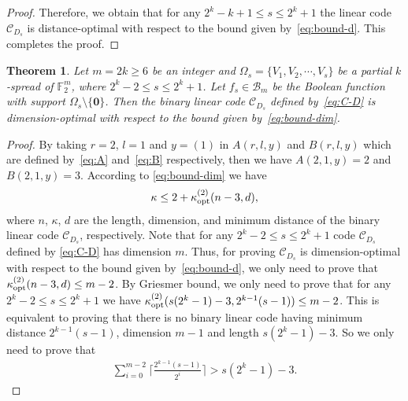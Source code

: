 \documentclass[10pt]{article}
\newtheorem{theorem}{Theorem}
\newcommand{\F}{\mathbb{F}}
\newcommand{\0}{\textbf{0}}
\newcommand{\1}{\textbf{1}}
\newcommand{\C}{{\mathcal C}}
\begin{document}
{\begin{proof}
Therefore, we obtain that for any $2^k-k+1\leq s\leq 2^k+1$ the linear code $\C_{D_s}$  is distance-optimal with respect to the bound given by~\eqref{eq:bound-d}.
This completes the proof.
\end{proof}



\begin{theorem}\label{T:BoundPS}
Let $m=2k\geq 6$ be an integer and $\Omega_s=\{V_1,V_2,\cdots,V_s\}$ be a partial $k$-spread of $\F_2^m$,
where $2^k-2\leq s\leq 2^k+1$.
Let $f_s\in\mathcal{B}_{m}$ be the Boolean function with support $\Omega_s\setminus\{\0\}$.
Then the binary linear code $\C_{D_s}$ defined by~\eqref{eq:C-D} is dimension-optimal with respect to the bound given by~\eqref{eq:bound-dim}.
\end{theorem}
\begin{proof}
By taking $r=2$, $l=1$ and $y=(1)$ in $A(r, l, y)$ and $B(r, l, y)$ which are defined by~\eqref{eq:A} and~\eqref{eq:B} respectively,
then we have  $A(2, 1, y)=2$ and  $B(2, 1, y)=3$.
According to \eqref{eq:bound-dim} we have
\begin{eqnarray*}
 \kappa\leq 2+\kappa_{\rm opt}^{(2)}(n-3, d),
\end{eqnarray*}
where $n$, $\kappa$, $d$ are the length, dimension, and minimum distance of the binary linear code  $\C_{D_s}$, respectively.
Note that for any $2^k-2\leq s\leq 2^k+1$ code $\C_{D_s}$ defined by \eqref{eq:C-D} has dimension $m$.
Thus, for proving $\C_{D_s}$ is dimension-optimal with respect to the bound given by~\eqref{eq:bound-d}, we only need to prove that $\kappa_{\rm opt}^{(2)}(n-3, d)\leq m-2$.
By Griesmer bound, we only need to prove that for any $2^k-2\leq  s \leq 2^k+1$ we have $\kappa_{\rm opt}^{(2)}(s(2^k-1)-3, 2^{k-1}(s-1))\leq m-2$.
This is equivalent to proving that there is no binary linear code having minimum distance $2^{k-1}(s-1)$, dimension $m-1$ and length $s(2^k-1)-3$.
So we only need to prove that
\begin{eqnarray}\label{Eq:PSoptimal}
\sum_{i=0}^{m-2}\bigg\lceil\frac{2^{k-1}(s-1)}{2^i}\bigg\rceil > s(2^k-1)-3.
\end{eqnarray}


\end{proof}}
\end{document}
